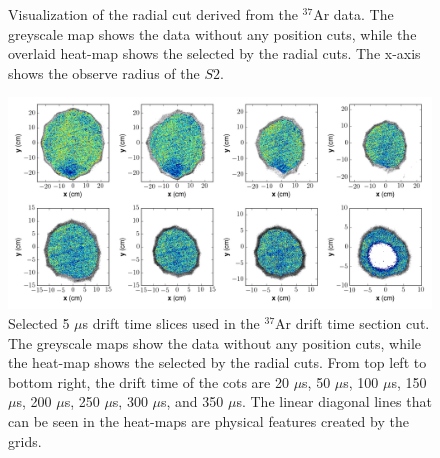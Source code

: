 {\begin{figure}[h!]
\caption{Visualization of the radial cut derived from the $^{37}$Ar data. The greyscale map shows the data without any position cuts, while the overlaid heat-map shows the selected by the radial cuts. The x-axis shows the observe radius of the $S2$.}
\label{fig:xycut_dt}
\end{figure}
\begin{figure}[h!]
\centering
  \includegraphics[width=\textwidth]{Figures/xycut_xy.png}
\caption{Selected 5 $\mu$s drift time slices used in the $^{37}$Ar drift time section cut. The greyscale maps show the data without any position cuts, while the heat-map shows the selected by the radial cuts. From top left to bottom right, the drift time of the cots are 20 $\mu$s, 50 $\mu$s, 100 $\mu$s, 150 $\mu$s, 200 $\mu$s, 250 $\mu$s, 300 $\mu$s, and 350 $\mu$s. The linear diagonal lines that can be seen in the heat-maps are physical features created by the grids.}
\label{fig:xycut_xy}
\end{figure}

}
